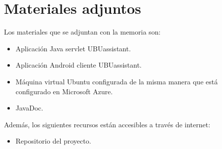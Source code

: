 \section{Materiales adjuntos}\label{materiales-adjuntos}

Los materiales que se adjuntan con la memoria son: 

\begin{itemize}
	\tightlist
	\item
	Aplicación Java servlet UBUassistant.
	\item
	Aplicación Android cliente UBUassistant.
	\item
	Máquina virtual Ubuntu configurada de la misma manera que está configurado en Microsoft Azure.
	\item	
	JavaDoc.
\end{itemize}

Además, los siguientes recursos están accesibles a través de internet:

\begin{itemize}
	\tightlist
	\item
	Repositorio del proyecto. \cite{ubuassistant:repo}
\end{itemize}
